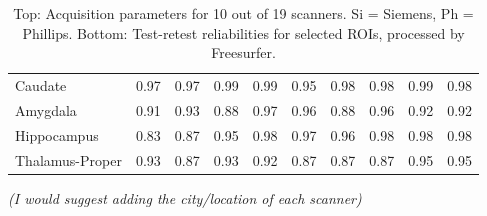 \begin{table}
\begin{tabular}{llllllllll}
Caudate                       &   0.97 &   0.97 &   0.99 &   0.99 &                  0.95 &   0.98 &                  0.98 &   0.99 &   0.98 \\
Amygdala                      &   0.91 &   0.93 &   0.88 &   0.97 &                  0.96 &   0.88 &                  0.96 &   0.92 &   0.92 \\
Hippocampus                   &   0.83 &   0.87 &   0.95 &   0.98 &                  0.97 &   0.96 &                  0.98 &   0.98 &   0.98 \\
Thalamus-Proper               &   0.93 &   0.87 &   0.93 &   0.92 &                  0.87 &   0.87 &                  0.87 &   0.95 &   0.95 \\
\bottomrule
\end{tabular}
\caption{Top: Acquisition parameters for 10 out of 19 scanners. Si = Siemens, Ph = Phillips. Bottom: Test-retest reliabilities for selected ROIs, processed by Freesurfer.} \textit{(I would suggest adding the city/location of each scanner)}\textbf{}
\label{tab:acquisition1}

\end{table}